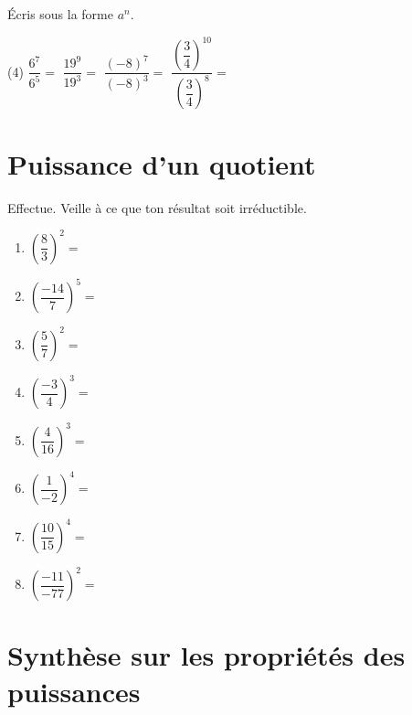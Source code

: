 \documentclass[../../syllabus_2.tex]{subfiles}
\begin{document}
\begin{exercise}
	Écris sous la forme \(a^n\).
	\begin{tasks}(4)
		\task \(\dfrac{6^7}{6^5}=\)
		\task \(\dfrac{19^9}{19^3}=\)
		\task \(\dfrac{(-8)^7}{(-8)^3}=\)
		\task \(\dfrac{\left(\dfrac{3}{4}\right)^{10}}{\left(\dfrac{3}{4}\right)^8}=\)
	\end{tasks}
\end{exercise}

\pagebreak
\section{Puissance d'un quotient}

\begin{center}
\end{center}

\begin{exercise}
	Effectue. Veille à ce que ton résultat soit irréductible.
	\begin{enumerate}[cols=2, itemsep=3cm]
		\item \(\left(\dfrac{8}{3}\right)^2=\)
		\item \(\left(\dfrac{-14}{7}\right)^5=\)
		\item \(\left(\dfrac{5}{7}\right)^2=\)
		\item \(\left(\dfrac{-3}{4}\right)^3=\)
		\item \(\left(\dfrac{4}{16}\right)^3=\)
		\item \(\left(\dfrac{1}{-2}\right)^4=\)
		\item \(\left(\dfrac{10}{15}\right)^4=\)
		\item \(\left(\dfrac{-11}{-77}\right)^2=\)
	\end{enumerate}
\end{exercise}

\section{Synthèse sur les propriétés des puissances}
\end{document}
